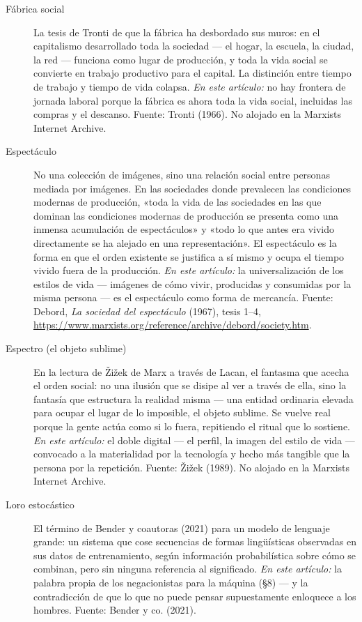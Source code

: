 \documentclass[11pt]{article}
\begin{document}
\begin{description}
\item[Fábrica social] La tesis de Tronti de que la fábrica ha desbordado
sus muros: en el capitalismo desarrollado toda la sociedad --- el
hogar, la escuela, la ciudad, la red --- funciona como lugar de
producción, y toda la vida social se convierte en trabajo productivo
para el capital. La distinción entre tiempo de trabajo y tiempo de vida
colapsa. \emph{En este artículo:} no hay frontera de jornada laboral
porque la fábrica es ahora toda la vida social, incluidas las compras y
el descanso. Fuente: Tronti (1966). No alojado en la Marxists Internet
Archive.

\item[Espectáculo] No una colección de imágenes, sino una relación social
entre personas mediada por imágenes. En las sociedades donde prevalecen
las condiciones modernas de producción, «toda la vida de las sociedades
en las que dominan las condiciones modernas de producción se presenta
como una inmensa acumulación de espectáculos» y «todo lo que antes era
vivido directamente se ha alejado en una representación». El espectáculo
es la forma en que el orden existente se justifica a sí mismo y ocupa
el tiempo vivido fuera de la producción. \emph{En este artículo:} la
universalización de los estilos de vida --- imágenes de cómo vivir,
producidas y consumidas por la misma persona --- es el espectáculo como
forma de mercancía. Fuente: Debord, \emph{La sociedad del
espectáculo} (1967), tesis 1--4,
\url{https://www.marxists.org/reference/archive/debord/society.htm}.

\item[Espectro (el objeto sublime)] En la lectura de \v{Z}i\v{z}ek de
Marx a través de Lacan, el fantasma que acecha el orden social: no una
ilusión que se disipe al ver a través de ella, sino la fantasía que
estructura la realidad misma --- una entidad ordinaria elevada para
ocupar el lugar de lo imposible, el objeto sublime. Se vuelve real
porque la gente actúa como si lo fuera, repitiendo el ritual que lo
sostiene. \emph{En este artículo:} el doble digital --- el perfil, la
imagen del estilo de vida --- convocado a la materialidad por la
tecnología y hecho más tangible que la persona por la repetición.
Fuente: \v{Z}i\v{z}ek (1989). No alojado en la Marxists Internet
Archive.

\item[Loro estocástico] El término de Bender y coautoras (2021) para un
modelo de lenguaje grande: un sistema que cose secuencias de formas
lingüísticas observadas en sus datos de entrenamiento, según información
probabilística sobre cómo se combinan, pero sin ninguna referencia al
significado. \emph{En este artículo:} la palabra propia de los
negacionistas para la máquina (§8) --- y la contradicción de que lo que
no puede pensar supuestamente enloquece a los hombres. Fuente: Bender
y co. (2021).


\end{description}
\end{document}

